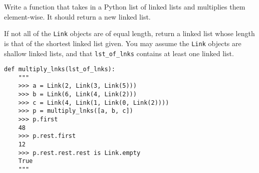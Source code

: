 \question
Write a function that takes in a Python list of linked lists and
multiplies them element-wise. It should return a new linked list.

If not all of the \texttt{Link} objects are of equal length, return a
linked list whose length is that of the shortest linked list given. You
may assume the \texttt{Link} objects are shallow linked lists, and that
\texttt{lst\_of\_lnks} contains at least one linked list.

\begin{lstlisting}
def multiply_lnks(lst_of_lnks):
    """
    >>> a = Link(2, Link(3, Link(5)))
    >>> b = Link(6, Link(4, Link(2)))
    >>> c = Link(4, Link(1, Link(0, Link(2))))
    >>> p = multiply_lnks([a, b, c])
    >>> p.first
    48
    >>> p.rest.first
    12
    >>> p.rest.rest.rest is Link.empty
    True
    """
\end{lstlisting}
